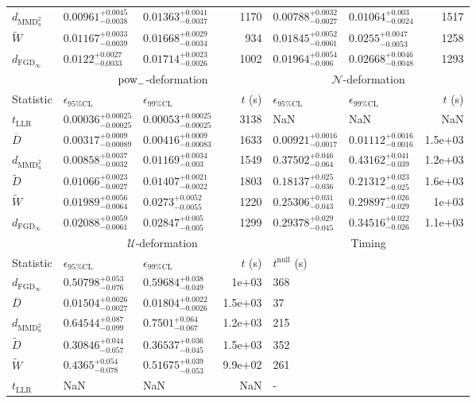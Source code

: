 \begin{tabular}{l|llr|llr}
	$d_{\mathrm{MMD}^{2}_{u}}$ & $0.00961_{-0.0038}^{+0.0045}$ & $0.01363_{-0.0037}^{+0.0041}$ & 1170 & $0.00788_{-0.0027}^{+0.0032}$ & $0.01064_{-0.0024}^{+0.003}$ & 1517 \\
	$\widetilde{W}$ & $0.01167_{-0.0039}^{+0.0033}$ & $0.01668_{-0.0034}^{+0.0029}$ & 934 & $0.01845_{-0.0061}^{+0.0052}$ & $0.0255_{-0.0053}^{+0.0047}$ & 1258 \\
	$d_{\mathrm{FGD}_{\infty}}$ & $0.0122_{-0.0033}^{+0.0027}$ & $0.01714_{-0.0026}^{+0.0023}$ & 1002 & $0.01964_{-0.006}^{+0.0054}$ & $0.02668_{-0.0048}^{+0.0046}$ & 1293 \\
	\toprule
	\multicolumn{1}{c}{} & \multicolumn{3}{c}{$\rm{pow}_{-}$-deformation} & \multicolumn{3}{c}{$\mathcal{N}$-deformation} \\
	Statistic & $\epsilon_{95\%\mathrm{CL}}$ & $\epsilon_{99\%\mathrm{CL}}$ & $t$ (s) & $\epsilon_{95\%\mathrm{CL}}$ & $\epsilon_{99\%\mathrm{CL}}$ & $t$ (s) \\
	\midrule
	$t_{\mathrm{LLR}}$ & $0.00036_{-0.00025}^{+0.00025}$ & $0.00053_{-0.00025}^{+0.00025}$ & 3138 & NaN & NaN & NaN \\
	$\overline{D}$ & $0.00317_{-0.00089}^{+0.0009}$ & $0.00416_{-0.00083}^{+0.0009}$ & 1633 & $0.00921_{-0.0017}^{+0.0016}$ & $0.01112_{-0.0016}^{+0.0016}$ & 1.5e+03 \\
	$d_{\mathrm{MMD}^{2}_{u}}$ & $0.00858_{-0.0032}^{+0.0037}$ & $0.01169_{-0.003}^{+0.0034}$ & 1549 & $0.37502_{-0.064}^{+0.046}$ & $0.43162_{-0.039}^{+0.041}$ & 1.2e+03 \\
	$\widetilde{D}$ & $0.01066_{-0.0027}^{+0.0023}$ & $0.01407_{-0.0022}^{+0.0021}$ & 1803 & $0.18137_{-0.036}^{+0.025}$ & $0.21312_{-0.025}^{+0.023}$ & 1.6e+03 \\
	$\widetilde{W}$ & $0.01989_{-0.0064}^{+0.0056}$ & $0.0273_{-0.0055}^{+0.0052}$ & 1220 & $0.25306_{-0.043}^{+0.031}$ & $0.29897_{-0.029}^{+0.026}$ & 1e+03 \\
	$d_{\mathrm{FGD}_{\infty}}$ & $0.02088_{-0.0061}^{+0.0059}$ & $0.02847_{-0.005}^{+0.005}$ & 1299 & $0.29378_{-0.045}^{+0.029}$ & $0.34516_{-0.026}^{+0.022}$ & 1.1e+03 \\
	\toprule
	\multicolumn{1}{c}{} & \multicolumn{3}{c}{$\mathcal{U}$-deformation} & \multicolumn{3}{c}{Timing} \\
	Statistic & $\epsilon_{95\%\mathrm{CL}}$ & $\epsilon_{99\%\mathrm{CL}}$ & $t$ (s) & $t^{\mathrm{null}}$ (s) \\
	\midrule
	$d_{\mathrm{FGD}_{\infty}}$ & $0.50798_{-0.076}^{+0.053}$ & $0.59684_{-0.049}^{+0.038}$ & 1e+03 & 368 \\
	$\overline{D}$ & $0.01504_{-0.0027}^{+0.0026}$ & $0.01804_{-0.0026}^{+0.0022}$ & 1.5e+03 & 37 \\
	$d_{\mathrm{MMD}^{2}_{u}}$ & $0.64544_{-0.099}^{+0.087}$ & $0.7501_{-0.067}^{+0.064}$ & 1.2e+03 & 215 \\
	$\widetilde{D}$ & $0.30846_{-0.057}^{+0.044}$ & $0.36537_{-0.045}^{+0.036}$ & 1.5e+03 & 352 \\
	$\widetilde{W}$ & $0.4365_{-0.078}^{+0.054}$ & $0.51675_{-0.053}^{+0.039}$ & 9.9e+02 & 261 \\
	$t_{\mathrm{LLR}}$ & NaN & NaN & NaN & - \\
	\bottomrule
\end{tabular}